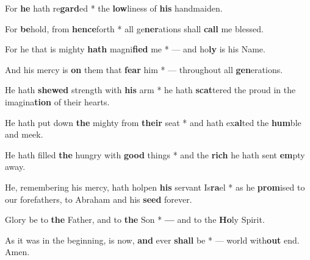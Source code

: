 \begin{multicols}{2}
	For \textbf{he} hath re\textbf{gard}ed * the \textbf{low}liness of \textbf{his} handmaiden.
	
	For \textbf{be}hold, from \textbf{hence}forth * all  ge\textbf{ner}ations shall \textbf{call} me blessed.
	
	For he that is mighty \textbf{hath} magni\textbf{fied} me * --- and ho\textbf{ly} is his Name.
	
	And his mercy is \textbf{on} them that \textbf{fear} him * --- throughout all \textbf{gen}erations.
	
	He hath \textbf{shewed} strength with \textbf{his} arm * he hath \textbf{scat}tered the proud in the imagina\textbf{tion} of their hearts.
	
	He hath put down \textbf{the} mighty from \textbf{their} seat * and hath ex\textbf{al}ted the \textbf{hum}ble and meek.
	
	He hath filled \textbf{the} hungry with \textbf{good} things * and the \textbf{rich} he hath sent \textbf{em}pty away.
	
	He, remembering his mercy, hath holpen \textbf{his} servant Is\textbf{ra}el * as he \textbf{prom}ised to our forefathers, to Abraham and his \textbf{seed} forever.
	
	Glory be to \textbf{the} Father, and to \textbf{the} Son * \textbf{---} and to the \textbf{Ho}ly Spirit.
	
	As it was in the beginning, is now, \textbf{and} ever \textbf{shall} be * --- world with\textbf{out} end. Amen.
\end{multicols}